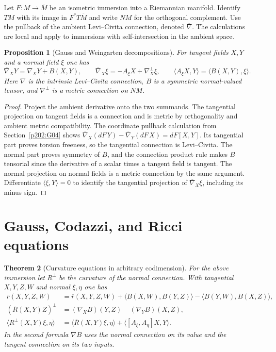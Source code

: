 \documentclass[11pt,oneside,openany]{book}
\theoremstyle{plain}
\newtheorem{theorem}{Theorem}[chapter]
\newtheorem{proposition}[theorem]{Proposition}
\theoremstyle{definition}
\theoremstyle{remark}
\begin{document}
Let \(F:M\to\overline M\) be an isometric immersion into a
Riemannian manifold. Identify \(TM\) with its image in
\(F^*T\overline M\) and write \(NM\) for the orthogonal complement.
Use the pullback of the ambient Levi--Civita connection, denoted
\(\overline\nabla\). The calculations are local and apply to
immersions with self-intersection in the ambient space.

\begin{proposition}[Gauss and Weingarten decompositions]
\label{prop:p202-gauss-weingarten}
For tangent fields \(X,Y\) and a normal field \(\xi\) one has
\[
 \overline\nabla_XY=\nabla_XY+B(X,Y),\qquad
 \overline\nabla_X\xi=-A_\xi X+\nabla^\perp_X\xi ,
 \qquad
 \langle A_\xi X,Y\rangle=\langle B(X,Y),\xi\rangle .
\]
Here \(\nabla\) is the intrinsic Levi--Civita connection,
\(B\) is a symmetric normal-valued tensor, and \(\nabla^\perp\)
is a metric connection on \(NM\).
\end{proposition}

\begin{proof}
Project the ambient derivative onto the two summands.
The tangential projection on tangent fields is a connection
and is metric by orthogonality and ambient metric compatibility.
The coordinate pullback calculation from Section~\ref{p202:G04}
shows
\(\overline\nabla_X(dF\,Y)-\overline\nabla_Y(dF\,X)=dF[X,Y]\).
Its tangential part proves torsion freeness, so the tangential
connection is Levi--Civita. The normal part proves symmetry of
\(B\), and the connection product rule makes \(B\) tensorial
since the derivative of a scalar times a tangent field is tangent.
The normal projection on normal fields is a metric connection by
the same argument. Differentiate \(\langle \xi,Y\rangle=0\)
to identify the tangential projection of
\(\overline\nabla_X\xi\), including its minus sign.
\end{proof}

\section{Gauss, Codazzi, and Ricci equations}\label{p202:G15}

\begin{theorem}[Curvature equations in arbitrary codimension]
\label{thm:p202-gauss-codazzi-ricci}
For the above immersion let \(R^\perp\) be the curvature of the
normal connection. With tangential \(X,Y,Z,W\) and normal
\(\xi,\eta\) one has
\begin{align*}
 r(X,Y,Z,W)
 &=\overline r(X,Y,Z,W)
   +\langle B(X,W),B(Y,Z)\rangle
   -\langle B(Y,W),B(X,Z)\rangle ,\\
 (\overline R(X,Y)Z)^\perp
 &=(\nabla_X B)(Y,Z)-(\nabla_Y B)(X,Z),\\
 \langle R^\perp(X,Y)\xi,\eta\rangle
 &=\langle\overline R(X,Y)\xi,\eta\rangle+
                           \langle[A_\xi,A_\eta]X,Y\rangle .
\end{align*}
In the second formula \(\nabla B\) uses the normal connection
on its value and the tangent connection on its two inputs.
\end{theorem}
\end{document}
